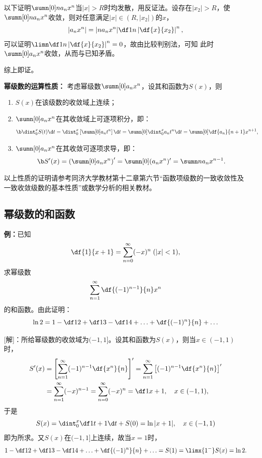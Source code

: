 以下证明$\sumn[0]na_nx^n$当$|x|>R$时均发散，用反证法。设存在$|x_2|>R$，使
$\sumn[0]na_nx^n$收敛，则对任意满足$|x|\in(R,|x_2|)$的$x$，
$$|a_nx^n|=|na_nx^n|\df1n\left|\df{x}{x_2}\right|^n,$$
可以证明$\limn\df1n\left|\df{x}{x_2}\right|^n=0$，故由比较判别法，可知
此时$\sumn[0]a_nx^n$收敛，从而与已知矛盾。

综上即证。\fin

\begin{thx}
	{\bf 幂级数的运算性质：}
	考虑幂级数$\sumn[0]a_nx^n$，设其和函数为$S(x)$，则
	\begin{enumerate}
	  \item $S(x)$在该级数的收敛域上连续；
	  \item $\sumn[0]a_nx^n$在其收敛域上可逐项积分，即：
	  $$\b \dint_0^xS(t)\d t=\dint_0^x\left[\sumn[0]a_nt^n\right]\d t
	  =\sumn[0]\dint_0^xa_nt^n\d t=\sumn[0]\df{a_n}{n+1}x^{n+1},$$
	  \item $\sumn[0]a_nx^n$在其收敛可逐项求导，即：
	  $$\b S'(x)=\left(\sumn[0]a_nx^n\right)'
	  =\sumn[0](a_nx^n)'=\sumn na_nx^{n-1}.$$
	\end{enumerate}
\end{thx}

以上性质的证明请参考{\kaishu 同济大学教材第十二章第六节“函数项级数的一致收敛性及
一致收敛级数的基本性质”}或{\kaishu 数学分析}的相关教材。

\subsection{幂级数的和函数}

{\bf 例：}已知
$$\df{1}{x+1}=\sum\limits_{n=0}^{\infty}(-x)^n\;(|x|<1),$$
求幂级数
$$\sum\limits_{n=1}^{\infty}\df{(-1)^{n-1}}{n}x^n$$
的和函数。由此证明：
$$\ln 2=1-\df 12+\df 13-\df 14+\ldots+\df{(-1)^n}{n}+\ldots$$

[解]：所给幂级数的收敛域为$(-1,1]$。设其和函数为$S(x)$，则当$x\in(-1,1)$时，
\begin{align*}
	S'(x)&=\left[\sum\limits_{n=1}^{\infty}(-1)^{n-1}\df{x^n}{n}\right]'
	=\sum\limits_{n=1}^{\infty}\left[(-1)^{n-1}\df{x^n}{n}\right]'\\
	&=\sum\limits_{n=1}^{\infty}(-x)^{n-1}
	=\sum\limits_{n=0}^{\infty}(-x)^{n}=\df1{x+1},\quad x\in(-1,1),
\end{align*}
于是
$$S(x)=\dint_0^x\df1{t+1}\d t+S(0)=\ln|x+1|, \quad x\in(-1,1)$$
即为所求。又$S(x)$在$(-1,1]$上连续，故当$x=1$时，
$$1-\df 12+\df 13-\df14+\ldots+\df{(-1)^n}{n}+\ldots
=S(1)=\limx{1^-}S(x)=\ln 2.$$
\fin

